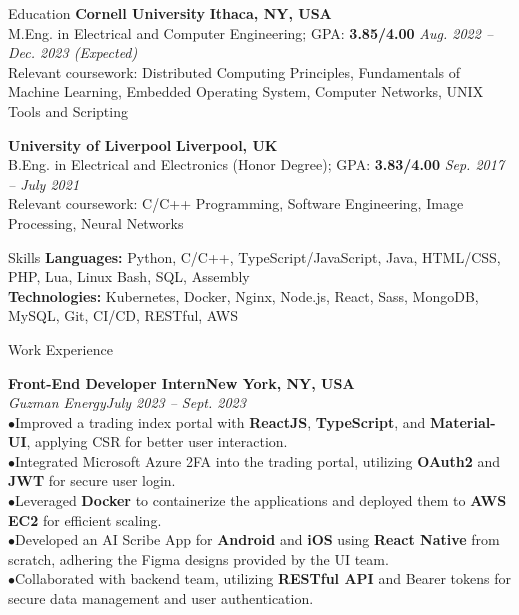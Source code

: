 \documentclass{resume} %
\begin{document}
\begin{rSection}{Education}
{\textbf{Cornell University}} \hfill{\textbf{Ithaca, NY, USA}}
\\ M.Eng. in Electrical and Computer Engineering; GPA: \textbf{3.85/4.00} \hfill{\em Aug. 2022 -- Dec. 2023 (Expected)}
\\ Relevant coursework: Distributed Computing Principles, Fundamentals of Machine Learning, Embedded Operating System, Computer Networks, UNIX Tools and Scripting

{\textbf{University of Liverpool}} \hfill{\textbf{Liverpool, UK}}
\\ B.Eng. in Electrical and Electronics (Honor Degree); GPA: \textbf{3.83/4.00} \hfill{\em Sep. 2017 -- July 2021}
\\ Relevant coursework: C/C++ Programming, Software Engineering, Image Processing, Neural Networks
\end{rSection}

\begin{rSection}{Skills}
{\textbf{Languages:}} Python, C/C++, TypeScript/JavaScript, Java, HTML/CSS, PHP, Lua, Linux Bash, SQL, Assembly
\\{\textbf{Technologies:}} Kubernetes, Docker, Nginx, Node.js, React, Sass, MongoDB, MySQL, Git, CI/CD, RESTful, AWS


\end{rSection}

\begin{rSection}{Work Experience}

{\bf Front-End Developer Intern}\hfill{\textbf{New York, NY, USA}}
\\{\em Guzman Energy}\hfill {\em July 2023 -- Sept. 2023}
\\ $ \bullet $Improved a trading index portal with \textbf{ReactJS}, \textbf{TypeScript}, and \textbf{Material-UI}, applying CSR for better user interaction.
\\ $ \bullet $Integrated Microsoft Azure 2FA into the trading portal, utilizing \textbf{OAuth2} and \textbf{JWT} for secure user login.
\\ $ \bullet $Leveraged \textbf{Docker} to containerize the applications and deployed them to \textbf{AWS EC2} for efficient scaling.
\\ $ \bullet $Developed an AI Scribe App for \textbf{Android} and \textbf{iOS} using \textbf{React Native} from scratch, adhering the Figma designs provided by the UI team.
\\ $ \bullet $Collaborated with backend team, utilizing \textbf{RESTful API} and Bearer tokens for secure data management and user authentication.


\end{rSection}
\end{document}

